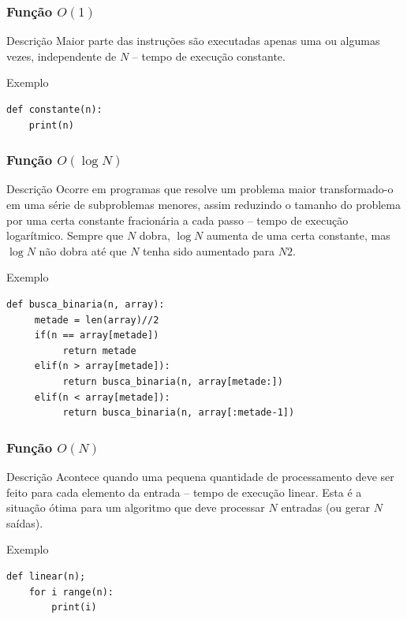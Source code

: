 \documentclass{beamer}
\begin{document}
\begin{frame}[fragile]
\frametitle{Função $O(1)$}

\begin{block}{Descrição}
Maior parte das instruções são executadas apenas uma ou algumas vezes, independente de $N$ -- tempo de execução constante.
\end{block}\vfill

\begin{exampleblock}{Exemplo}
\begin{lstlisting}
def constante(n):
    print(n)
\end{lstlisting}
\end{exampleblock}
\end{frame}

\begin{frame}[fragile]
\frametitle{Função $O(\log N)$}

\begin{block}{Descrição}
Ocorre em programas que resolve um problema maior transformado-o em uma série de subproblemas menores, assim reduzindo o tamanho do problema por uma certa constante fracionária a cada passo -- tempo de execução logarítmico. Sempre que $N$ dobra, $\log N$ aumenta de uma certa constante, mas $\log N$ não dobra até que $N$ tenha sido aumentado para $N2$.
\end{block}\vfill

\begin{exampleblock}{Exemplo}
\begin{lstlisting}
def busca_binaria(n, array):
     metade = len(array)//2
     if(n == array[metade])
          return metade
     elif(n > array[metade]):
          return busca_binaria(n, array[metade:])
     elif(n < array[metade]):
          return busca_binaria(n, array[:metade-1])
\end{lstlisting}	
\end{exampleblock}
\end{frame}

\begin{frame}[fragile]
\frametitle{Função $O(N)$}

\begin{block}{Descrição}
Acontece quando uma pequena quantidade de processamento deve ser feito para cada elemento da entrada -- tempo de execução linear. Esta é a situação ótima para um algoritmo que deve processar $N$ entradas (ou gerar $N$ saídas).
\end{block} \vfill

\begin{exampleblock}{Exemplo}
\begin{lstlisting}
def linear(n);
    for i range(n):
        print(i)
\end{lstlisting}	
\end{exampleblock}
\end{frame}
\end{document}

